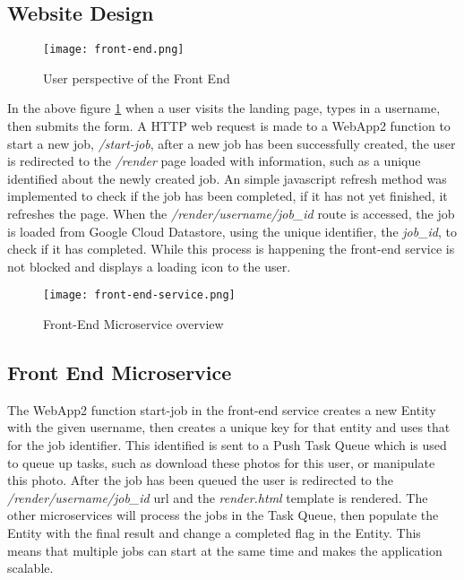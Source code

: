 \documentclass[conference]{IEEEtran}
\begin{document}
\subsection{Website Design}

\begin{figure}[ht] %
    \centering
    \texttt{[image: front-end.png]}
    \caption{User perspective of the Front End}
    \label{fig:fe}
\end{figure}

In the above figure \ref{fig:fe} when a user visits the landing page, types in a username, then submits the form. A HTTP web request is made to a WebApp2 function to start a new job, \emph{/start-job}, after a new job has been successfully created, the user is redirected to the \emph{/render} page loaded with information, such as a unique identified about the newly created job. An simple javascript refresh method was implemented to check if the job has been completed, if it has not yet finished, it refreshes the page. When the \emph{/render/username/job\_id} route is accessed, the job is loaded from Google Cloud Datastore, using the unique identifier, the \emph{job\_id}, to check if it has completed. While this process is happening the front-end service is not blocked and displays a loading icon to the user.

\begin{figure}[ht]
    \centering
    \texttt{[image: front-end-service.png]}
    \caption{Front-End Microservice overview}
    \label{fig:fes}
\end{figure}


\subsection{Front End Microservice}

The WebApp2 function start-job in the front-end service creates a new Entity with the given username, then creates a unique key for that entity and uses that for the job identifier. This identified is sent to a Push Task Queue \cite{gae:taskqueues} which is used to queue up tasks, such as download these photos for this user, or manipulate this photo. After the job has been queued the user is redirected to the \emph{/render/username/job\_id} url and the \emph{render.html} template is rendered. The other microservices will process the jobs in the Task Queue, then populate the Entity with the final result and change a completed flag in the Entity. This means that multiple jobs can start at the same time and makes the application scalable.
\end{document}

